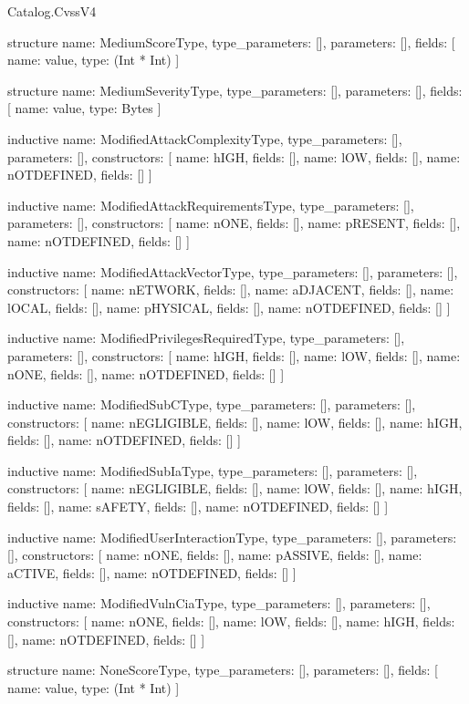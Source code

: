 \begin{lexlean}{Catalog.CvssV4}
\begin{semanticmodule}
structure{
  name: MediumScoreType,
  type_parameters: [],
  parameters: [],
  fields: [
    {name: value, type: (Int * Int)}
  ]
}

structure{
  name: MediumSeverityType,
  type_parameters: [],
  parameters: [],
  fields: [
    {name: value, type: Bytes}
  ]
}

inductive{
  name: ModifiedAttackComplexityType,
  type_parameters: [],
  parameters: [],
  constructors: [
    {name: hIGH, fields: []},
    {name: lOW, fields: []},
    {name: nOTDEFINED, fields: []}
  ]
}

inductive{
  name: ModifiedAttackRequirementsType,
  type_parameters: [],
  parameters: [],
  constructors: [
    {name: nONE, fields: []},
    {name: pRESENT, fields: []},
    {name: nOTDEFINED, fields: []}
  ]
}

inductive{
  name: ModifiedAttackVectorType,
  type_parameters: [],
  parameters: [],
  constructors: [
    {name: nETWORK, fields: []},
    {name: aDJACENT, fields: []},
    {name: lOCAL, fields: []},
    {name: pHYSICAL, fields: []},
    {name: nOTDEFINED, fields: []}
  ]
}

inductive{
  name: ModifiedPrivilegesRequiredType,
  type_parameters: [],
  parameters: [],
  constructors: [
    {name: hIGH, fields: []},
    {name: lOW, fields: []},
    {name: nONE, fields: []},
    {name: nOTDEFINED, fields: []}
  ]
}

inductive{
  name: ModifiedSubCType,
  type_parameters: [],
  parameters: [],
  constructors: [
    {name: nEGLIGIBLE, fields: []},
    {name: lOW, fields: []},
    {name: hIGH, fields: []},
    {name: nOTDEFINED, fields: []}
  ]
}

inductive{
  name: ModifiedSubIaType,
  type_parameters: [],
  parameters: [],
  constructors: [
    {name: nEGLIGIBLE, fields: []},
    {name: lOW, fields: []},
    {name: hIGH, fields: []},
    {name: sAFETY, fields: []},
    {name: nOTDEFINED, fields: []}
  ]
}

inductive{
  name: ModifiedUserInteractionType,
  type_parameters: [],
  parameters: [],
  constructors: [
    {name: nONE, fields: []},
    {name: pASSIVE, fields: []},
    {name: aCTIVE, fields: []},
    {name: nOTDEFINED, fields: []}
  ]
}

inductive{
  name: ModifiedVulnCiaType,
  type_parameters: [],
  parameters: [],
  constructors: [
    {name: nONE, fields: []},
    {name: lOW, fields: []},
    {name: hIGH, fields: []},
    {name: nOTDEFINED, fields: []}
  ]
}

structure{
  name: NoneScoreType,
  type_parameters: [],
  parameters: [],
  fields: [
    {name: value, type: (Int * Int)}
  ]
}


\end{semanticmodule}
\end{lexlean}
